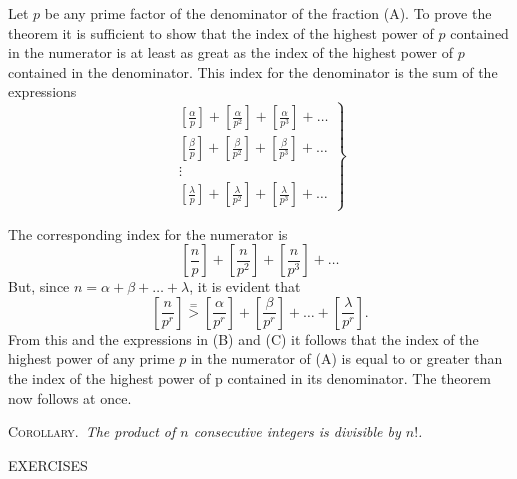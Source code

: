 \documentclass[oneside]{book}
\begin{document}
Let $p$ be any prime factor of the denominator of the fraction (A).
To prove the theorem it is sufficient to show that the index of the
highest power of $p$ contained in the numerator is at least as great
as the index of the highest power of $p$ contained in the
denominator. This index for the denominator is the sum of the
expressions
\begin{equation}
  \left .
   \begin{gathered}
    \left [ \frac{\alpha}{p} \right ] +
    \left [ \frac{\alpha}{p^2} \right ] +
    \left [ \frac{\alpha}{p^3} \right ] +
    \ldots \\
    \left [ \frac{\beta}{p} \right ] +
    \left [ \frac{\beta}{p^2} \right ] +
    \left [ \frac{\beta}{p^3} \right ] +
    \ldots \\
      \vdots \\
    \left [ \frac{\lambda}{p} \right ] +
    \left [ \frac{\lambda}{p^2} \right ] +
    \left [ \frac{\lambda}{p^3} \right ] +
    \ldots
   \end{gathered}
  \right \} \tag{B}
\end{equation}

The corresponding index for the numerator is
\begin{equation}
\left [ \frac{n}{p} \right ] +
\left [ \frac{n}{p^2} \right ] +
\left [ \frac{n}{p^3} \right ] +
\ldots \tag{C}
\end{equation}
But, since $n = \alpha + \beta + \ldots + \lambda$, it is evident
that
\begin{equation*}
   \left [ \frac{n}{p^r} \right ] \stackrel{=}{>}
   \left [ \frac{\alpha}{p^r} \right ] +
   \left [ \frac{\beta}{p^r} \right ] +
   \ldots +
   \left [ \frac{\lambda}{p^r} \right ].
\end{equation*}
From this and the expressions in (B) and (C) it follows that the
index of the highest power of any prime $p$ in the numerator of (A)
is equal to or greater than the index of the highest power of p
contained in its denominator. The theorem now follows at once.

\smallskip \textsc{Corollary.}~\emph{The product of $n$ consecutive
integers is divisible by $n!$.}

\begin{center}
EXERCISES
\end{center}
\end{document}
